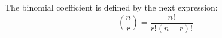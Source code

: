 The binomial coefficient is defined by the next expression:
$$ \binom{n}{r} = \frac{n!}{r! (n-r)!} $$